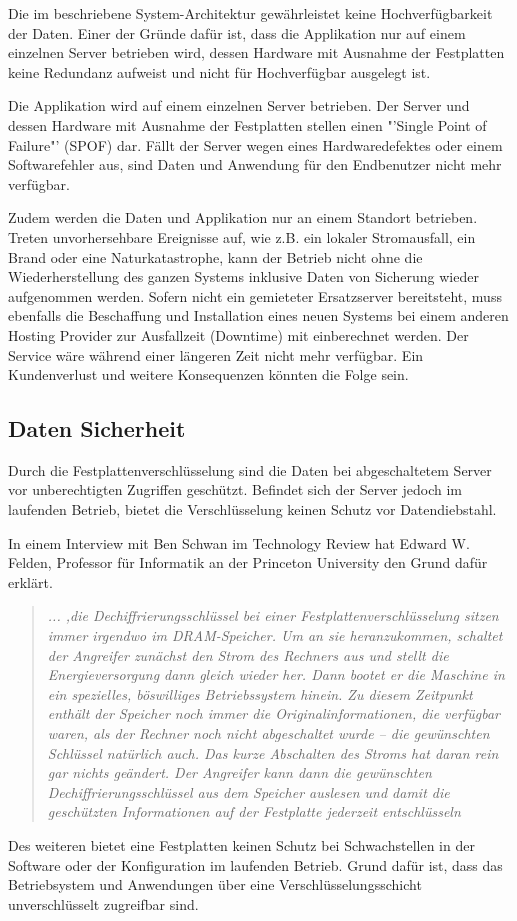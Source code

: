 Die im   beschriebene System-Architektur gewährleistet keine Hochverfügbarkeit der Daten. Einer der Gründe dafür ist, dass die Applikation nur auf einem einzelnen Server betrieben wird, dessen Hardware mit Ausnahme der Festplatten keine Redundanz aufweist und nicht für Hochverfügbar ausgelegt ist. 

Die Applikation wird auf einem einzelnen Server betrieben. Der Server und dessen Hardware mit Ausnahme der Festplatten stellen einen "'Single Point of Failure"' (SPOF) dar. Fällt der Server wegen eines Hardwaredefektes oder einem Softwarefehler aus, sind Daten und Anwendung für den Endbenutzer nicht mehr verfügbar.

Zudem werden die Daten und Applikation nur an einem Standort betrieben. Treten unvorhersehbare Ereignisse auf, wie z.B. ein lokaler Stromausfall, ein Brand oder eine Naturkatastrophe, kann der Betrieb nicht ohne die Wiederherstellung des ganzen Systems inklusive Daten von Sicherung wieder aufgenommen werden. Sofern nicht ein gemieteter Ersatzserver bereitsteht, muss ebenfalls die Beschaffung und Installation eines neuen Systems bei einem anderen Hosting Provider zur Ausfallzeit (Downtime) mit einberechnet werden. Der Service wäre während einer längeren Zeit nicht mehr verfügbar. Ein Kundenverlust und weitere Konsequenzen könnten die Folge sein.

\subsection{Daten Sicherheit}
Durch die Festplattenverschlüsselung sind die Daten bei abgeschaltetem Server vor unberechtigten Zugriffen geschützt. Befindet sich der Server jedoch im laufenden Betrieb, bietet die Verschlüsselung keinen Schutz vor Datendiebstahl. 

In einem Interview mit Ben Schwan im Technology Review hat Edward W. Felden, Professor für Informatik an der Princeton University den Grund dafür erklärt. 

\begin{quotation}\em
... ,die Dechiffrierungsschlüssel bei einer Festplattenverschlüsselung sitzen immer irgendwo im DRAM-Speicher. Um an sie heranzukommen, schaltet der Angreifer zunächst den Strom des Rechners aus und stellt die Energieversorgung dann gleich wieder her. Dann bootet er die Maschine in ein spezielles, böswilliges Betriebssystem hinein. Zu diesem Zeitpunkt enthält der Speicher noch immer die Originalinformationen, die verfügbar waren, als der Rechner noch nicht abgeschaltet wurde – die gewünschten Schlüssel natürlich auch. Das kurze Abschalten des Stroms hat daran rein gar nichts geändert. Der Angreifer kann dann die gewünschten Dechiffrierungsschlüssel aus dem Speicher auslesen und damit die geschützten Informationen auf der Festplatte jederzeit entschlüsseln\end{quotation}\cite{Schwan2008}

Des weiteren bietet eine Festplatten keinen Schutz bei Schwachstellen in der Software oder  der Konfiguration im laufenden Betrieb. Grund dafür ist, dass das Betriebsystem und Anwendungen über eine Verschlüsselungsschicht unverschlüsselt zugreifbar sind.

